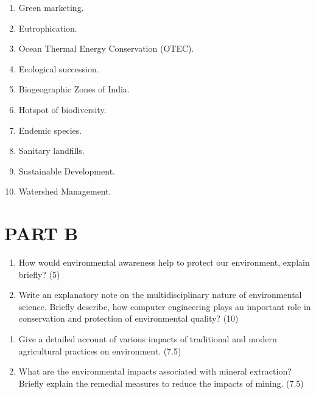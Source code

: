 \documentclass[12pt,a4paper]{article}
\begin{document}
\begin{questions}
    \item \begin{enumerate}[label=(\alph*), leftmargin=2em]
        \item Green marketing. 
        \item Eutrophication.
        \item Ocean Thermal Energy Conservation (OTEC).
        \item Ecological succession. 
        \item Biogeographic Zones of India.
        \item Hotspot of biodiversity. 
        \item Endemic species. 
        \item Sanitary landfills.
        \item Sustainable Development.
        \item Watershed Management.
    \end{enumerate}

\vspace{1em}

\section*{\textbf{PART B}}

    \item \begin{enumerate}[label=(\alph*), leftmargin=2em]
        \item How would environmental awareness help to protect our environment, explain briefly? \hfill (5)
        \item Write an explanatory note on the multidisciplinary nature of environmental science. Briefly describe, how computer engineering plays an important role in conservation and protection of environmental quality? \hfill (10)
    \end{enumerate}

    \vspace{\baselineskip}
    
    \item \begin{enumerate}[label=(\alph*), leftmargin=2em]
        \item Give a detailed account of various impacts of traditional and modern agricultural practices on environment. \hfill (7.5)
        \item What are the environmental impacts associated with mineral extraction? Briefly explain the remedial measures to reduce the impacts of mining. \hfill (7.5)
    \end{enumerate}


\end{questions}
\end{document}
